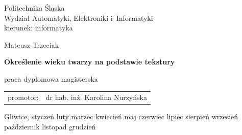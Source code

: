 \documentclass[a4paper,twoside,12pt]{book}
\newcommand{\miesiac}{%
\ifcase\the\month
\or styczeń%
\or luty%
\or marzec%
\or kwiecień%
\or maj%
\or czerwiec%
\or lipiec%
\or sierpień%
\or wrzesień%
\or październik%
\or listopad%
\or grudzień%
\fi}
\newcommand{\autor}{Mateusz Trzeciak}
\newcommand{\promotor}{dr hab.
inż.
Karolina Nurzyńska}
\newcommand{\tytul}{Określenie wieku twarzy na podstawie tekstury}
\begin{document}

    \pagestyle{empty}
    \sffamily

    \noindent

    \begin{center}
        \large
        Politechnika Śląska\\
        Wydział Automatyki, Elektroniki i~Informatyki \\
        kierunek: informatyka
    \end{center}

    \vfill\vfill
    \begin{center}
        \large
        \autor
    \end{center}

    \vfill
    \begin{center}
        \LARGE\bfseries \tytul
    \end{center}

    \vfill
    \begin{center}
        \large
        praca dyplomowa magisterska
    \end{center}

    \vfill\vfill\vfill
    \begin{center}
        \large
        \begin{tabular}{ll}
            promotor: & \promotor \\
        \end{tabular}

    \end{center}

    \vfill
    \begin{center}
        \large
        Gliwice,  \miesiac\ \the\year
    \end{center}

    \cleardoublepage


    \rmfamily
    \normalfont

    \cleardoublepage

    

    \cleardoublepage

    
\end{document}
